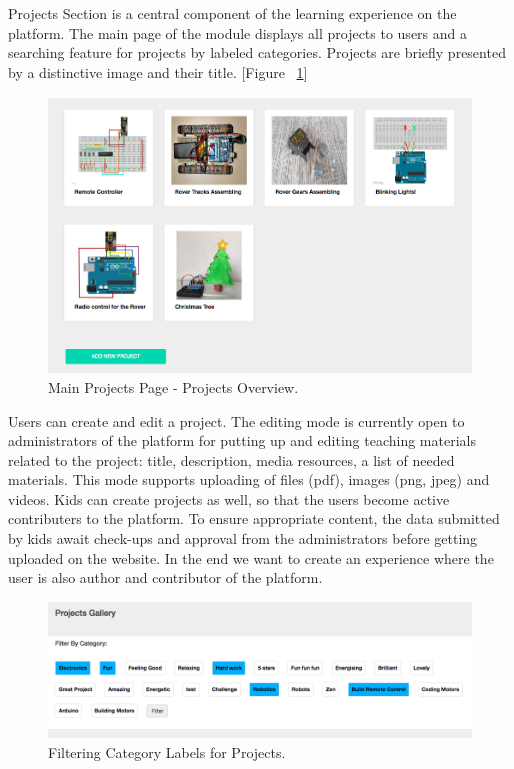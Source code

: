 Projects Section is a central component of the learning experience on the platform.
The main page of the module displays all projects to users and a searching feature for projects by labeled categories. Projects are briefly presented by a distinctive image and their title. [Figure ~\ref{fig:projects_display}]\\

\begin{figure}
\includegraphics[width=1\linewidth]{images/ui/DisplayProjects.png}
\caption{Main Projects Page - Projects Overview.}
\label{fig:projects_display}
\end{figure}

Users can create and edit a project. The editing mode is currently open to administrators of the platform for putting up and editing teaching materials related to the project: title, description, media resources, a list of needed materials. This mode supports uploading of files (pdf), images (png, jpeg) and videos.
Kids can create projects as well, so that the users become active contributers to the platform. To ensure appropriate content, the data submitted by kids await check-ups and approval from the administrators before getting uploaded on the website.
In the end we want to create an experience where the user is also author and contributor of the platform. \\

\begin{figure}
\includegraphics[width=1\linewidth]{images/ui/Labels.png}
\caption{Filtering Category Labels for Projects.}
\label{fig:labels}
\end{figure}

